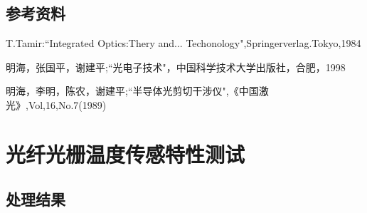 \documentclass{zjureport}
\begin{document}
\subsection{参考资料}
 \begin{clause}
 \item T.Tamir:“Integrated Optics:Thery and... Techonology",Springerverlag.Tokyo,1984
 \item 明海，张国平，谢建平;“光电子技术"，中国科学技术大学出版社，合肥，1998
 \item 明海，李明，陈农，谢建平;“半导体光剪切干涉仪",《中国激光》,Vol,16,No.7(1989)
 \end{clause}
 
\section{光纤光栅温度传感特性测试}

  \subsection{处理结果}
\end{document}
